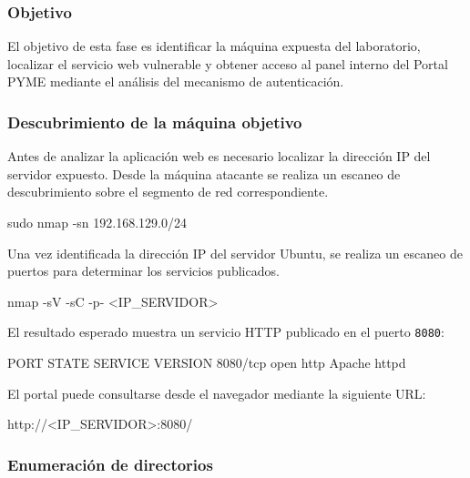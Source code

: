 

\subsubsection*{Objetivo}

El objetivo de esta fase es identificar la máquina expuesta del laboratorio, localizar el servicio web vulnerable y obtener acceso al panel interno del Portal PYME mediante el análisis del mecanismo de autenticación.

\subsubsection*{Descubrimiento de la máquina objetivo}

Antes de analizar la aplicación web es necesario localizar la dirección IP del servidor expuesto. Desde la máquina atacante se realiza un escaneo de descubrimiento sobre el segmento de red correspondiente.

\begin{bashbox}
sudo nmap -sn 192.168.129.0/24
\end{bashbox}

Una vez identificada la dirección IP del servidor Ubuntu, se realiza un escaneo de puertos para determinar los servicios publicados.

\begin{bashbox}
nmap -sV -sC -p- <IP_SERVIDOR>
\end{bashbox}

El resultado esperado muestra un servicio HTTP publicado en el puerto \texttt{8080}:

\begin{configbox}
PORT     STATE SERVICE VERSION
8080/tcp open  http    Apache httpd
\end{configbox}

El portal puede consultarse desde el navegador mediante la siguiente URL:

\begin{configbox}
http://<IP_SERVIDOR>:8080/
\end{configbox}

\subsubsection*{Enumeración de directorios}

